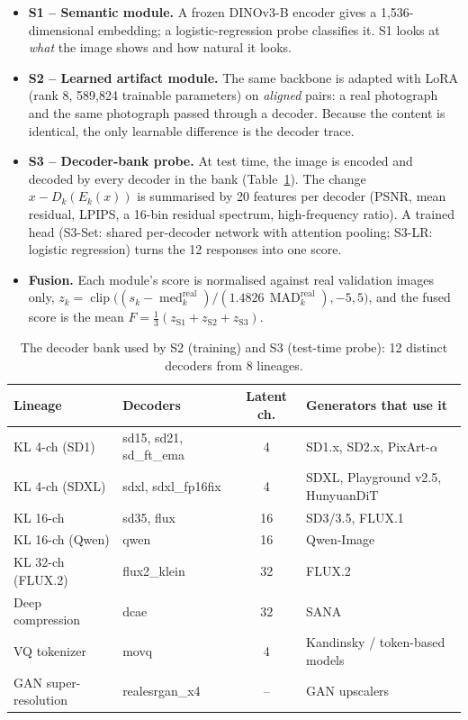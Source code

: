 \begin{itemize}
    \item \textbf{S1 -- Semantic module.} A frozen DINOv3-B encoder gives a 1,536-dimensional embedding; a logistic-regression probe classifies it. S1 looks at \textit{what} the image shows and how natural it looks.
    \item \textbf{S2 -- Learned artifact module.} The same backbone is adapted with LoRA (rank 8, 589,824 trainable parameters) on \textit{aligned} pairs: a real photograph and the same photograph passed through a decoder. Because the content is identical, the only learnable difference is the decoder trace.
    \item \textbf{S3 -- Decoder-bank probe.} At test time, the image is encoded and decoded by every decoder in the bank (Table~\ref{tab:bank}). The change $x - D_k(E_k(x))$ is summarised by 20 features per decoder (PSNR, mean residual, LPIPS, a 16-bin residual spectrum, high-frequency ratio). A trained head (S3-Set: shared per-decoder network with attention pooling; S3-LR: logistic regression) turns the 12 responses into one score.
    \item \textbf{Fusion.} Each module's score is normalised against real validation images only, $z_k = \operatorname{clip}\big((s_k - \operatorname{med}_k^{\mathrm{real}})/(1.4826\,\operatorname{MAD}_k^{\mathrm{real}}), -5, 5\big)$, and the fused score is the mean $F = \frac{1}{3}(z_{\mathrm{S1}} + z_{\mathrm{S2}} + z_{\mathrm{S3}})$.
\end{itemize}

\begin{table}[H]
\centering
\footnotesize
\caption{The decoder bank used by S2 (training) and S3 (test-time probe): 12 distinct decoders from 8 lineages.}
\label{tab:bank}
\begin{tabular}{>{\raggedright\arraybackslash}p{3.0cm} >{\raggedright\arraybackslash}p{4.6cm} c >{\raggedright\arraybackslash}p{4.4cm}}
\toprule
\textbf{Lineage} & \textbf{Decoders} & \textbf{Latent ch.} & \textbf{Generators that use it} \\
\midrule
KL 4-ch (SD1) & sd15, sd21, sd\_ft\_ema & 4 & SD1.x, SD2.x, PixArt-$\alpha$ \\
KL 4-ch (SDXL) & sdxl, sdxl\_fp16fix & 4 & SDXL, Playground v2.5, HunyuanDiT \\
KL 16-ch & sd35, flux & 16 & SD3/3.5, FLUX.1 \\
KL 16-ch (Qwen) & qwen & 16 & Qwen-Image \\
KL 32-ch (FLUX.2) & flux2\_klein & 32 & FLUX.2 \\
Deep compression & dcae & 32 & SANA \\
VQ tokenizer & movq & 4 & Kandinsky / token-based models \\
GAN super-resolution & realesrgan\_x4 & -- & GAN upscalers \\
\bottomrule
\end{tabular}
\end{table}

